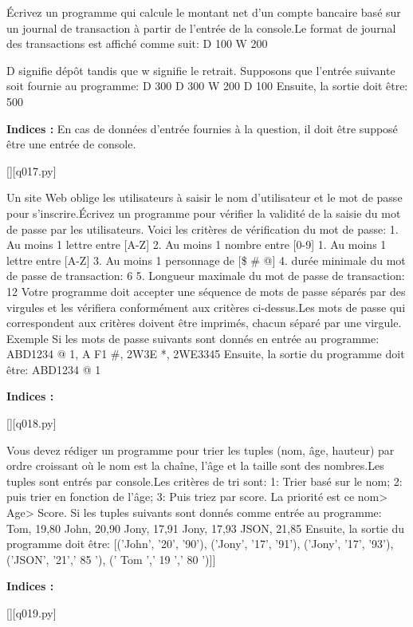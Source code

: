 \question
Écrivez un programme qui calcule le montant net d'un compte bancaire basé sur un journal de transaction à partir de l'entrée de la console.Le format de journal des transactions est affiché comme suit:
D 100
W 200

D signifie dépôt tandis que w signifie le retrait.
Supposons que l'entrée suivante soit fournie au programme:
D 300
D 300
W 200
D 100
Ensuite, la sortie doit être:
500
\par
\textbf{Indices : }En cas de données d'entrée fournies à la question, il doit être supposé être une entrée de console.
\renewcommand{\nomfichier}{q017.py}
\begin{solution}
    \pythonfile{\chemincode \nomfichier}[][q017.py]
\end{solution}


\question
Un site Web oblige les utilisateurs à saisir le nom d'utilisateur et le mot de passe pour s'inscrire.Écrivez un programme pour vérifier la validité de la saisie du mot de passe par les utilisateurs.
Voici les critères de vérification du mot de passe:
1. Au moins 1 lettre entre [A-Z]
2. Au moins 1 nombre entre [0-9]
1. Au moins 1 lettre entre [A-Z]
3. Au moins 1 personnage de [\$ \# @]
4. durée minimale du mot de passe de transaction: 6
5. Longueur maximale du mot de passe de transaction: 12
Votre programme doit accepter une séquence de mots de passe séparés par des virgules et les vérifiera conformément aux critères ci-dessus.Les mots de passe qui correspondent aux critères doivent être imprimés, chacun séparé par une virgule.
Exemple
Si les mots de passe suivants sont donnés en entrée au programme:
ABD1234 @ 1, A F1 \#, 2W3E *, 2WE3345
Ensuite, la sortie du programme doit être:
ABD1234 @ 1
\par
\textbf{Indices : }
\renewcommand{\nomfichier}{q018.py}
\begin{solution}
    \pythonfile{\chemincode \nomfichier}[][q018.py]
\end{solution}


\question
Vous devez rédiger un programme pour trier les tuples (nom, âge, hauteur) par ordre croissant où le nom est la chaîne, l'âge et la taille sont des nombres.Les tuples sont entrés par console.Les critères de tri sont:
1: Trier basé sur le nom;
2: puis trier en fonction de l'âge;
3: Puis triez par score.
La priorité est ce nom> Age> Score.
Si les tuples suivants sont donnés comme entrée au programme:
Tom, 19,80
John, 20,90
Jony, 17,91
Jony, 17,93
JSON, 21,85
Ensuite, la sortie du programme doit être:
[('John', '20', '90'), ('Jony', '17', '91'), ('Jony', '17', '93'), ('JSON', '21',' 85 '), (' Tom ',' 19 ',' 80 ')]]
\par
\textbf{Indices : }
\renewcommand{\nomfichier}{q019.py}
\begin{solution}
    \pythonfile{\chemincode \nomfichier}[][q019.py]
\end{solution}


